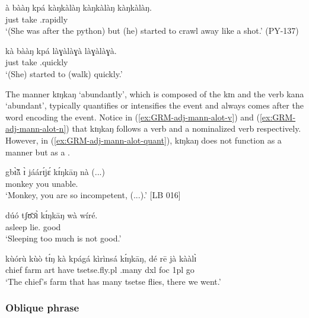 \begin{exe}
\begin{exe}
\begin{exe}
\ea\label{ex:GRM-adj-mann-ideo-adv}


\ea\label{ex:GRM-adj-mann-ideo}
\gll à bààŋ kpá {kàŋkàlàŋ kàŋkàlàŋ kàŋkàlàŋ}.\\
{\conn} just take {\ideo}.rapidly\\
\glt `(She was after the python) but (he) started to crawl away like a shot.' 
(PY-137)

\ex\label{ex:GRM-adj-mann-adv}
\gll  kà bààŋ kpá {làɣàlàɣà làɣàlàɣà}.\\
{\conn} just take {\ideo}.quickly  \\
\glt `(She) started to (walk) quickly.'

\z 
 \z


The manner  {\sls kɪŋkaŋ} `abundantly',  which is composed of the  {\sls kɪn} and the verb {\sls kana} `abundant',  typically quantifies or intensifies the event and always comes after the word encoding the event.  Notice in (\ref{ex:GRM-adj-mann-alot-v})  and (\ref{ex:GRM-adj-mann-alot-n})   that {\sls kɪŋkaŋ} follows a verb and a nominalized verb respectively. However, in (\ref{ex:GRM-adj-mann-alot-quant}), {\sls kɪŋkaŋ} does not function as a manner  but as a .

\ea\label{ex:GRM-adj-mann-alot}
\ea\label{ex:GRM-adj-mann-alot-v}
\gll gbɪ̃̀ã́     ɪ̀    jáárɪ́jɛ́  kɪ́ŋkāŋ    nà
(...)\\
monkey   you  unable.{\pfv}  {\dxm} {\foc} {}\\
\glt `Monkey, you are so incompetent, (...).' [LB 016]

\ex\label{ex:GRM-adj-mann-alot-n}
\gll dúó tʃʊ̄ɔ̄ɪ̀ kɪ́ŋkāŋ wà wíré.\\
asleep lie.{\nmlz} {\dxm} {\neg} good\\
\glt `Sleeping too much is not good.'

\ex\label{ex:GRM-adj-mann-alot-quant}
\gll kùórù   kùò tɪ́ŋ   kà   kpágá kìrìnsá  kɪ́ŋkāŋ, dé rē jà kààlɪ̀\\
 chief farm {\sc art} {\rel} have tsetse.fly.{\sc pl}  {\quant}.many {\sc dxl} {\sc foc} {\sc 1pl} go\\
\glt   `The chief's farm that has  many tsetse flies, there we went.' 

\z 
 \z

\subsubsection{Oblique phrase}
\label{sec:GRM-obl-phrase}


\end{exe}
\end{exe}
\end{exe}
